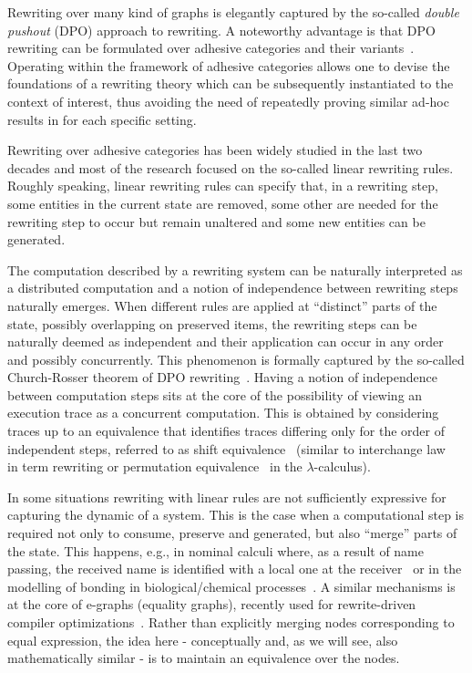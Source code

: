 \documentclass[a4paper,UKenglish,cleveref,pdftex, thm-restate,numberwithinsect]{lipics}
\begin{document}
Rewriting over many kind of graphs is elegantly captured by the
so-called \emph{double pushout} (DPO) approach to rewriting. A
noteworthy advantage is that DPO rewriting can be formulated over
adhesive categories and their
variants~\cite{lack2005adhesive,ehrig2006weak}. Operating within the
framework of adhesive categories allows one to devise the foundations
of a rewriting theory which can be subsequently instantiated to the
context of interest, thus avoiding the need of repeatedly proving
similar ad-hoc results in for each specific setting.

Rewriting over adhesive categories has been widely studied in the last
two decades and most of the research focused on the so-called linear
rewriting rules. Roughly speaking, linear rewriting rules can specify
that, in a rewriting step, some entities in the current state are
removed, some other are needed for the rewriting step to occur but
remain unaltered and some new entities can be generated.

The computation described by a rewriting system can be naturally
interpreted as a distributed computation and a notion of independence
between rewriting steps naturally emerges. When different rules are
applied at ``distinct'' parts of the state, possibly overlapping on
preserved items, the rewriting steps can be naturally deemed as
independent and their application can occur in any order and possibly
concurrently. This phenomenon is formally captured by the so-called
Church-Rosser theorem of DPO rewriting~\cite{CMREHL:AAGT}.
%
Having a notion of independence between computation steps sits at the
core of the possibility of viewing an execution trace as a concurrent
computation. This is obtained by considering traces up to an
equivalence that identifies traces differing only for the order of
independent steps, referred to as shift equivalence~\cite{CMREHL:AAGT}
(similar to interchange law~\cite{Mes92} in term rewriting or
permutation equivalence~\cite{JJL80} in the $\lambda$-calculus).

In some situations rewriting with linear rules are not sufficiently
expressive for capturing the dynamic of a system. This is the case
when a computational step is required not only to consume, preserve
and generated, but also ``merge'' parts of the state. This happens,
e.g., in nominal calculi where, as a result of name passing, the
received name is identified with a local one at the
receiver~\cite{CVY:ESSPE,Gad07} or in the modelling of bonding in
biological/chemical processes~\cite{PUY:MBPE}. A similar mechanisms is
at the core of e-graphs (equality graphs), recently used for
rewrite-driven compiler optimizations~\cite{WNW:egg}. Rather than
explicitly merging nodes corresponding to equal expression, the idea
here - conceptually and, as we will see, also mathematically similar -
is to maintain an equivalence
over the nodes.  
\end{document}
